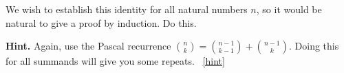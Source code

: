 \documentclass{book}
\begin{document}
\setcounter{project}{77}
\addtocounter{project}{-1}
\begin{activity}[]\label{activity-70}
\hypertarget{p-604}{}%
We wish to establish this identity for all natural numbers \(n\), so it would be natural to give a proof by induction.  Do this.%
\par\smallskip%
\noindent\textbf{Hint.}\hypertarget{hint-33}{}\quad%
\hypertarget{p-605}{}%
Again, use the Pascal recurrence \(\binom{n}{k} = \binom{n-1}{k-1} + \binom{n-1}{k}\).  Doing this for all summands will give you some repeats.%
~\hfill{\tiny\hyperlink{a-77}{[hint]}\hypertarget{q-77}{}}\end{activity}
\end{document}
